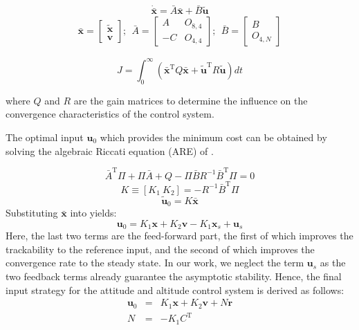 \begin{equation}
  \dot{\bar{\bm{x}}}=\bar{A}\bar{\bm{x}}+\bar{B}\tilde{\bm{u}}
  \label{eq:extended_state_eq}
\end{equation}
\begin{eqnarray*}
  \bar{\bm{x}}=
  \begin{bmatrix}
    \tilde{\bm{x}}\\
    \bm{v}
  \end{bmatrix};\ \
  \bar{A}=
  \begin{bmatrix}
    A &O_{8,4}\\
    -C &O_{4,4}
  \end{bmatrix};\ \
  \bar{B}=
  \begin{bmatrix}
    B\\
    O_{4,N}
  \end{bmatrix}
\end{eqnarray*}

\begin{equation}
  J=\int^{\infty}_0 (\bar{\bm{x}}^\mathrm{T}Q\bar{\bm{x}}+\tilde{\bm{u}}^\mathrm{T}R\tilde{\bm{u}})dt
  \label{eq:cost_function}
\end{equation}

where $Q$ and $R$ are the gain matrices to determine the influence on the convergence characteristics of the control system. 
\par
The optimal input $\bm{u}_0$ which provides the minimum cost can be obtained by solving the algebraic Riccati equation (ARE) of .

\begin{equation}
  \bar{A}^\mathrm{T}\Pi+\Pi\bar{A}+Q-\Pi\bar{B}R^{-1}\bar{B}^\mathrm{T}\Pi=0
  \label{eq:riccati}
\end{equation}
\begin{equation}
  K\equiv [K_1 \ K_2]=-R^{-1}\bar{B}^\mathrm{T}\Pi 
\end{equation}
\begin{equation}
  \tilde{\bm{u}}_0=K\bar{\bm{x}}
  \label{eq:optimal_input}
\end{equation}
Substituting $\bar{\bm{x}}$ into  yields:
\begin{equation}
  \bm{u}_0=K_1\bm{x}+K_2\bm{v}-K_1\bm{x}_s+\bm{u}_s
  \label{eq:optimal_input_substitute}
\end{equation}
Here, the last two terms are the feed-forward part, the first of which improves the trackability to the reference input, and the second of which improves the convergence rate to the steady state. In our work, we neglect the term $\bm{u}_s$ as the two feedback terms already guarantee the asymptotic stability. Hence, the final input strategy for the attitude and altitude control system is derived as follows:
\begin{eqnarray}
  \bm{u}_0&=&K_1\bm{x}+K_2\bm{v}+N\bm{r}
  \label{eq:optimal_input_modified}\\
  N&=&-K_1C^\mathrm{T}
\end{eqnarray}



